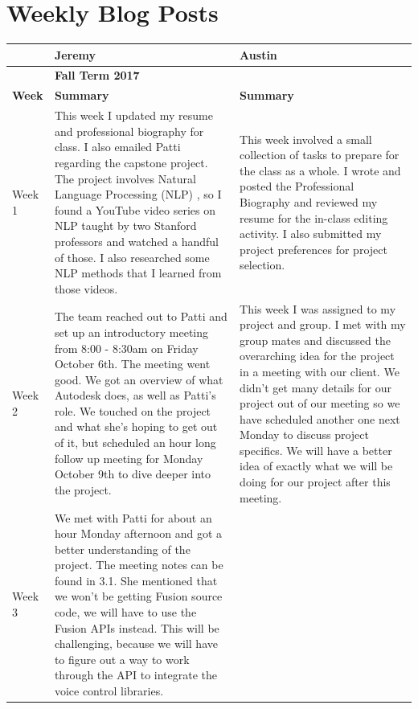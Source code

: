 \documentclass[onecolumn, draftclsnofoot,10pt, compsoc]{IEEEtran}
\begin{document}
\section{Weekly Blog Posts}
	\begin{center}
		\begin{longtabu} to \textwidth {|X[2,l]|X[8,l]|X[8,l]|}
			\hline
			& \textbf{\Large{Jeremy}} & \textbf{\Large{Austin}}  \\ \hline
			&	\textbf{\large{Fall Term 2017}}  &\\ \hline
			\textbf{Week} & \textbf{Summary}  & \textbf{Summary }\\ \hline

			Week 1
			&
			{
				This week I updated my resume and professional biography for class. I also emailed Patti regarding the capstone project. The project involves Natural Language Processing (NLP) , so I found a YouTube video series on NLP taught by two Stanford professors and watched a handful of those. I also researched some NLP methods that I learned from those videos.
			}

			&
			{
				This week involved a small collection of tasks to prepare for the class as a whole.
				I wrote and posted the Professional Biography and reviewed my resume for the in-class editing activity.
				I also submitted my project preferences for project selection.
			}
			\\ \hline

			Week 2
			&
			{
				The team reached out to Patti and set up an introductory meeting from 8:00 - 8:30am on Friday October 6th. The meeting went good. We got an overview of what Autodesk does, as well as Patti's role. We touched on the project and what she's hoping to get out of it, but scheduled an hour long follow up meeting for Monday October 9th to dive deeper into the project.
			}

			&
			{
				This week I was assigned to my project and group.
				I met with my group mates and discussed the overarching idea for the project in a meeting with our client.
				We didn't get many details for our project out of our meeting so we have scheduled another one next Monday to discuss project specifics.
				We will have a better idea of exactly what we will be doing for our project after this meeting.
			}
			\\ \hline

			Week 3
			&
			{
				We met with Patti for about an hour Monday afternoon and got a better understanding of the project. The meeting notes can be found in 3.1. She mentioned that we won't be getting Fusion source code, we will have to use the Fusion APIs instead. This will be challenging, because we will have to figure out a way to work through the API to integrate the voice control libraries.

}
\end{longtabu}
\end{center}
\end{document}
